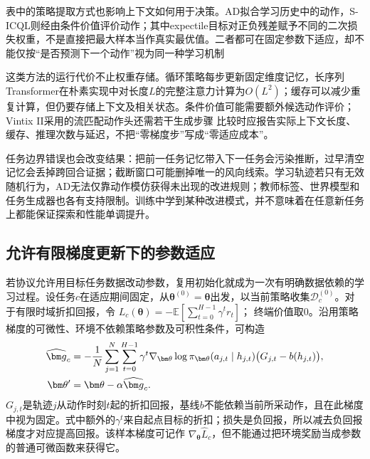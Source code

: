 表中的策略提取方式也影响上下文如何用于决策。AD拟合学习历史中的动作，S-ICQL则经由条件价值评价动作；其中expectile目标对正负残差赋予不同的二次损失权重，不是直接把最大样本当作真实最优值。二者都可在固定参数下适应，却不能仅按“是否预测下一个动作”视为同一种学习机制

这类方法的运行代价不止权重存储。循环策略每步更新固定维度记忆，长序列Transformer在朴素实现中对长度$L$的完整注意力计算为$O(L^2)$；缓存可以减少重复计算，但仍要存储上下文及相关状态。条件价值可能需要额外候选动作评价；Vintix II采用的流匹配动作头还需若干生成步骤
比较时应报告实际上下文长度、缓存、推理次数与延迟，不把“零梯度步”写成“零适应成本”。

任务边界错误也会改变结果：把前一任务记忆带入下一任务会污染推断，过早清空记忆会丢掉跨回合证据；截断窗口可能删掉唯一的风向线索。学习轨迹若只有无效随机行为，AD无法仅靠动作模仿获得未出现的改进规则；教师标签、世界模型和任务生成器也各有支持限制。训练中学到某种改进模式，并不意味着在任意新任务上都能保证探索和性能单调提升。

\subsection{允许有限梯度更新下的参数适应}
\label{sec:rl-transfer-gradient-adaptation}

若协议允许用目标任务数据改动参数，复用初始化就成为一次有明确数据依赖的学习过程。设任务$c$在适应期间固定，从$\bm\theta^{(0)}=\bm\theta$出发，以当前策略收集$\mathcal D_c^{(0)}$。对于有限时域折扣回报，令
$L_c(\bm\theta)=-\mathbb E[\sum_{t=0}^{H-1}\gamma^t r_t]$；
终端价值取0。沿用策略梯度的可微性、环境不依赖策略参数及可积性条件，可构造
\begin{align}
 \widehat{\bm g}_c
 &=-\frac1N\sum_{j=1}^N\sum_{t=0}^{H-1}
   \gamma^t\nabla_{\bm\theta}\log\pi_{\bm\theta}
        (a_{j,t}\mid h_{j,t})
   \bigl(G_{j,t}-b(h_{j,t})\bigr),\notag\\
 \bm\theta'&=\bm\theta-\alpha\widehat{\bm g}_c.
 \label{eq:rl-transfer-inner-update}
\end{align}
$G_{j,t}$是轨迹$j$从动作时刻$t$起的折扣回报，基线$b$不能依赖当前所采动作，且在此梯度中视为固定。式中额外的$\gamma^t$来自起点目标的折扣；损失是负回报，所以减去负回报梯度才对应提高回报。该样本梯度可记作
$\nabla_{\bm\theta}\widehat L_c$，但不能通过把环境奖励当成参数的普通可微函数来获得它。

